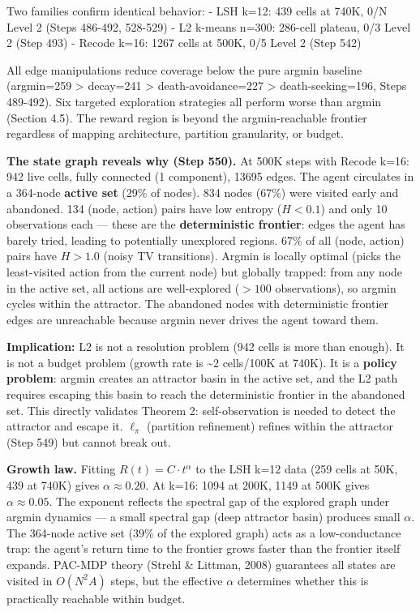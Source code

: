 \documentclass[
  11pt,
]{article}
\begin{document}
Two families confirm identical behavior: - LSH k=12: 439 cells at 740K,
0/N Level 2 (Steps 486-492, 528-529) - L2 k-means n=300: 286-cell
plateau, 0/3 Level 2 (Step 493) - Recode k=16: 1267 cells at 500K, 0/5
Level 2 (Step 542)

All edge manipulations reduce coverage below the pure argmin baseline
(argmin=259 \textgreater{} decay=241 \textgreater{} death-avoidance=227
\textgreater{} death-seeking=196, Steps 489-492). Six targeted
exploration strategies all perform worse than argmin (Section 4.5). The
reward region is beyond the argmin-reachable frontier regardless of
mapping architecture, partition granularity, or budget.

\textbf{The state graph reveals why (Step 550).} At 500K steps with
Recode k=16: 942 live cells, fully connected (1 component), 13695 edges.
The agent circulates in a 364-node \textbf{active set} (29\% of nodes).
834 nodes (67\%) were visited early and abandoned. 134 (node, action)
pairs have low entropy (\(H < 0.1\)) and only 10 observations each ---
these are the \textbf{deterministic frontier}: edges the agent has
barely tried, leading to potentially unexplored regions. 67\% of all
(node, action) pairs have \(H > 1.0\) (noisy TV transitions). Argmin is
locally optimal (picks the least-visited action from the current node)
but globally trapped: from any node in the active set, all actions are
well-explored (\(> 100\) observations), so argmin cycles within the
attractor. The abandoned nodes with deterministic frontier edges are
unreachable because argmin never drives the agent toward them.

\textbf{Implication:} L2 is not a resolution problem (942 cells is more
than enough). It is not a budget problem (growth rate is
\textasciitilde2 cells/100K at 740K). It is a \textbf{policy problem}:
argmin creates an attractor basin in the active set, and the L2 path
requires escaping this basin to reach the deterministic frontier in the
abandoned set. This directly validates Theorem 2: self-observation is
needed to detect the attractor and escape it. \(\ell_\pi\) (partition
refinement) refines within the attractor (Step 549) but cannot break
out.

\textbf{Growth law.} Fitting \(R(t) = C \cdot t^\alpha\) to the LSH k=12
data (259 cells at 50K, 439 at 740K) gives \(\alpha \approx 0.20\). At
k=16: 1094 at 200K, 1149 at 500K gives \(\alpha \approx 0.05\). The
exponent reflects the spectral gap of the explored graph under argmin
dynamics --- a small spectral gap (deep attractor basin) produces small
\(\alpha\). The 364-node active set (39\% of the explored graph) acts as
a low-conductance trap: the agent's return time to the frontier grows
faster than the frontier itself expands. PAC-MDP theory (Strehl \&
Littman, 2008) guarantees all states are visited in \(O(N^2 A)\) steps,
but the effective \(\alpha\) determines whether this is practically
reachable within budget.
\end{document}
